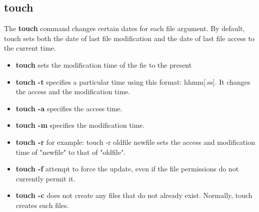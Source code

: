 \documentclass[10pt,a4paper]{scrartcl}
\begin{document}
\subsection{touch}
\begin{singlespacing}
The {\bf touch} command changes certain dates for each file argument. By default, touch sets both the date of last file modification and the date of last file access to the current time.
\end{singlespacing}
\begin{doublespacing}
\begin{itemize}
\item{\bf{touch}} \qquad sets the modification time of the fie to the present
\item{\bf{touch -t}} \qquad specifies a particular time using this format:\newline
\qquad [cc][yy][MM][dd]hhmm[.ss]. It changes the access and the modification time.
\item{\bf{touch -a}} \qquad specifies the access time.
\item{\bf{touch -m}} \qquad specifies the modification time.
\item{\bf{touch -r}} \qquad for example: touch -r oldfile newfile \newline
\qquad sets the access and modification time of "newfile" to that of "oldfile".
\item{\bf{touch -f}} \qquad  attempt to force the update, even if the file permissions do not currently permit it. 
\item{\bf{touch -c}} \qquad     does not create any files that do not already exist. Normally, touch creates such files.
\end{itemize}
\end{doublespacing}
\end{document}
